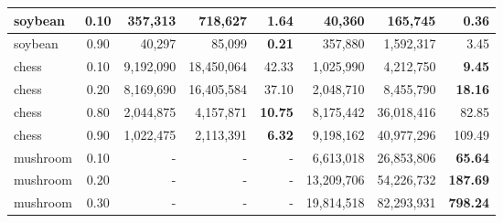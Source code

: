 \begin{table}[H]
\begin{tabular}{|l|c|r|r|r|r|r|r|}
        soybean                           & 0.10                              & 357,313                                              & 718,627                                              & 1.64            & 40,360        & 165,745          & \textbf{0.36}   \\ \hline
        soybean                           & 0.90                              & 40,297                                               & 85,099                                               & \textbf{0.21}   & 357,880       & 1,592,317        & 3.45            \\ \hline
        chess                             & 0.10                              & 9,192,090                                            & 18,450,064                                           & 42.33           & 1,025,990     & 4,212,750        & \textbf{9.45}   \\ \hline
        chess                             & 0.20                              & 8,169,690                                            & 16,405,584                                           & 37.10           & 2,048,710     & 8,455,790        & \textbf{18.16}  \\ \hline
        chess                             & 0.80                              & 2,044,875                                            & 4,157,871                                            & \textbf{10.75}  & 8,175,442     & 36,018,416       & 82.85           \\ \hline
        chess                             & 0.90                              & 1,022,475                                            & 2,113,391                                            & \textbf{6.32}   & 9,198,162     & 40,977,296       & 109.49          \\ \hline
        mushroom                          & 0.10                              & -                                                    & -                                                    & -               & 6,613,018     & 26,853,806       & \textbf{65.64}  \\ \hline
        mushroom                          & 0.20                              & -                                                    & -                                                    & -               & 13,209,706    & 54,226,732       & \textbf{187.69} \\ \hline
        mushroom                          & 0.30                              & -                                                    & -                                                    & -               & 19,814,518    & 82,293,931       & \textbf{798.24} \\ \hline

\end{tabular}
\end{table}
